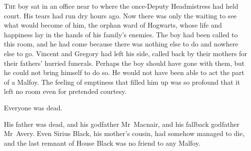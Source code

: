 
\lettrine{T}{he} boy sat in an office near to where the once-Deputy Headmistress had held court. His tears had run dry hours ago. Now there was only the waiting to see what would become of him, the orphan ward of Hogwarts, whose life and happiness lay in the hands of his family’s enemies. The boy had been called to this room, and he had come because there was nothing else to do and nowhere else to go. Vincent and Gregory had left his side, called back by their mothers for their fathers’ hurried funerals. Perhaps the boy should have gone with them, but he could not bring himself to do so. He would not have been able to act the part of a Malfoy. The feeling of emptiness that filled him up was so profound that it left no room even for pretended courtesy.

Everyone was dead.

His father was dead, and his godfather Mr~Macnair, and his fallback godfather Mr~Avery. Even Sirius Black, his mother’s cousin, had somehow managed to die, and the last remnant of House Black was no friend to any Malfoy.

